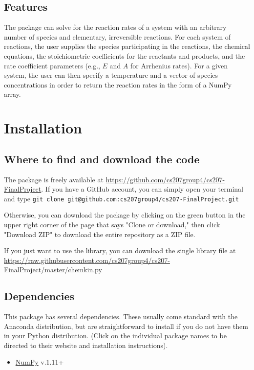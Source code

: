 \documentclass[12pt]{article}
\begin{document}
\subsection{Features}
The package can solve for the reaction rates of a system with an arbitrary number of species and elementary, irreversible reactions. For each system of reactions, the user supplies the species participating in the reactions, the chemical equations, the stoichiometric coefficients for the reactants and products, and the rate coefficient parameters (e.g., $E$ and $A$ for Arrhenius rates). For a given system, the user can then specify a temperature and a vector of species concentrations in order to return the reaction rates in the form of a NumPy array. 

\section{Installation} 

\subsection{Where to find and download the code}
The package is freely available at \url{https://github.com/cs207group4/cs207-FinalProject}. If you have a GitHub account, you can simply open your terminal and type
\newline
{\tt git clone git@github.com:cs207group4/cs207-FinalProject.git} \newline

Otherwise, you can download the package by clicking on the green button in the upper right corner of the page that says "Clone or download," then click "Download ZIP" to download the entire repository as a ZIP file.

If you just want to use the library, you can download the single library file at \url{https://raw.githubusercontent.com/cs207group4/cs207-FinalProject/master/chemkin.py}

\subsection{Dependencies}

This package has several dependencies. These usually come standard with the Anaconda distribution, but are straightforward to install if you do not have them in your Python distribution. (Click on the individual package names to be directed to their website and installation instructions).  
\begin{itemize}
\item \href{http://www.numpy.org/}{NumPy} v.1.11+
\end{itemize}
\end{document}
